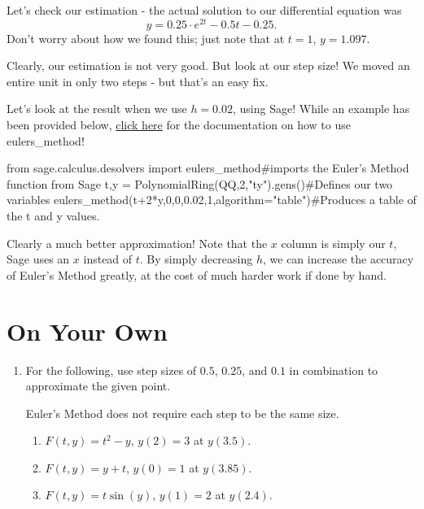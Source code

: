 \documentclass{ximera}
\begin{document}
Let's check our estimation - the actual solution to our differential equation was $$y = 0.25\cdot e^{2t}-0.5t-0.25\text{.}$$ Don't worry about how we found this; just note that at $t=1$, $y = 1.097$.

Clearly, our estimation is not very good. But look at our step size! We moved an entire unit in only two steps - but that's an easy fix.

Let's look at the result when we use $h = 0.02$, using Sage! While an example has been provided below, \href{http://doc.sagemath.org/html/en/reference/calculus/sage/calculus/desolvers.html#sage.calculus.desolvers.eulers\_method}{click here} for the documentation on how to use eulers\_method!
\begin{onlineOnly}
\begin{sageCell}
from sage.calculus.desolvers import eulers_method#imports the Euler's Method function from Sage
t,y = PolynomialRing(QQ,2,"ty").gens()#Defines our two variables
eulers_method(t+2*y,0,0,0.02,1,algorithm="table")#Produces a table of the t and y values.
\end{sageCell}
\end{onlineOnly}

Clearly a much better approximation! Note that the $x$ column is simply our $t$, Sage uses an $x$ instead of $t$. By simply decreasing $h$, we can increase the accuracy of Euler's Method greatly, at the cost of much harder work if done by hand.

\section{On Your Own}

\begin{enumerate}
\item For the following, use step sizes of $0.5$, $0.25$, and $0.1$ in combination to approximate the given point. 

\begin{remark}
Euler's Method does not require each step to be the same size.
\end{remark}
\begin{enumerate}
\item $F(t,y) = t^2 -y$, $y(2) = 3$ at $y(3.5)$.
\item $F(t,y) = y+t$, $y(0)=1$ at $y(3.85)$.
\item $F(t,y) = t\sin(y)$, $y(1) = 2$ at $y(2.4)$.
\end{enumerate}
\end{enumerate}
\end{document}
